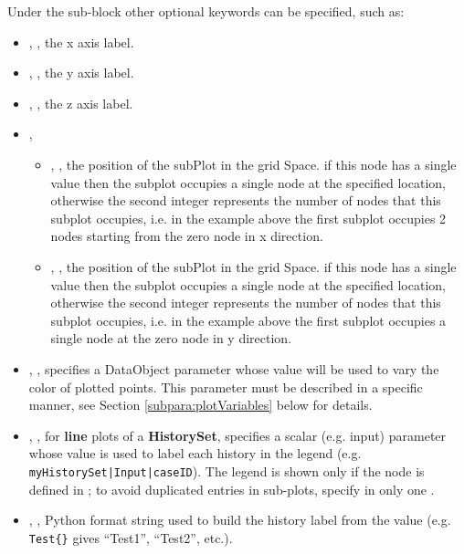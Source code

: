 Under the  sub-block other optional keywords can be specified, such as:
\begin{itemize}
  \item {}, , the x axis
  label.
  \item {}, , the y axis
  label.
  \item {}, ,
  the z axis label.
  \item {}, 
  \begin{itemize}
	\item {}, , the position of the subPlot in the grid Space.
	if this node has a single value then the subplot occupies a single node at the specified location, otherwise
        the second integer represents the number of nodes that this subplot occupies, i.e. in the example above the
        first subplot occupies 2 nodes starting from the zero node in x direction.
	\item {}, , the position of the subPlot in the grid Space.
	if this node has a single value then the subplot occupies a single node at the specified location, otherwise
        the second integer represents the number of nodes that this subplot occupies, i.e. in the example above the
        first subplot occupies a single node at the zero node in y direction.
  \end{itemize}
  \item {}, , specifies a DataObject parameter whose value will be used
	to vary the color of plotted points.  This parameter must be described in a specific manner, see Section \ref{subpara:plotVariables}
	below for details.
  \item {}, , for \textbf{line} plots of a \textbf{HistorySet},
	specifies a scalar (e.g. input) parameter whose value is used to label each history in the legend
	(e.g. \texttt{myHistorySet|Input|caseID}). The legend is shown only if the  node is defined in
	; to avoid duplicated entries in sub-plots, specify  in only one .
  \item {}, , Python format string used to build the
	history label from the  value (e.g. \texttt{Test\{\}} gives ``Test1'', ``Test2'', etc.).
 \end{itemize}

